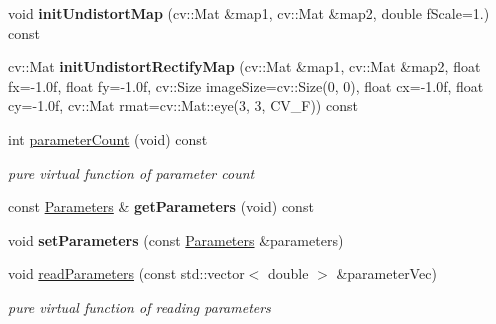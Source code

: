 \begin{DoxyCompactItemize}
\mbox{\label{classcamodocal_1_1PinholeCamera_a8553c07cf81d005a24b335b3da9ceed4}} 
void {\bfseries init\+Undistort\+Map} (cv\+::\+Mat \&map1, cv\+::\+Mat \&map2, double f\+Scale=1.) const
\item 
\mbox{\label{classcamodocal_1_1PinholeCamera_a693831534ad3140dd83f18371e761fbb}} 
cv\+::\+Mat {\bfseries init\+Undistort\+Rectify\+Map} (cv\+::\+Mat \&map1, cv\+::\+Mat \&map2, float fx=-\/1.\+0f, float fy=-\/1.\+0f, cv\+::\+Size image\+Size=cv\+::\+Size(0, 0), float cx=-\/1.\+0f, float cy=-\/1.\+0f, cv\+::\+Mat rmat=cv\+::\+Mat\+::eye(3, 3, C\+V\+\_\+F)) const
\item 
\mbox{\label{classcamodocal_1_1PinholeCamera_af1b4715f8d9a6a7ba3e866d5bf2721d2}} 
int \hyperlink{classcamodocal_1_1PinholeCamera_af1b4715f8d9a6a7ba3e866d5bf2721d2}{parameter\+Count} (void) const
\begin{DoxyCompactList}\small\item\em pure virtual function of parameter count \end{DoxyCompactList}\item 
\mbox{\label{classcamodocal_1_1PinholeCamera_a8aae0528cc081d881b3052fde80b1d24}} 
const \hyperlink{classcamodocal_1_1PinholeCamera_1_1Parameters}{Parameters} \& {\bfseries get\+Parameters} (void) const
\item 
\mbox{\label{classcamodocal_1_1PinholeCamera_ae3b36f6c08d76b4abe2b00c34f3ef58b}} 
void {\bfseries set\+Parameters} (const \hyperlink{classcamodocal_1_1PinholeCamera_1_1Parameters}{Parameters} \&parameters)
\item 
\mbox{\label{classcamodocal_1_1PinholeCamera_a6014010b2fb08fbef76fa5ef2f4b5d80}} 
void \hyperlink{classcamodocal_1_1PinholeCamera_a6014010b2fb08fbef76fa5ef2f4b5d80}{read\+Parameters} (const std\+::vector$<$ double $>$ \&parameter\+Vec)
\begin{DoxyCompactList}\small\item\em pure virtual function of reading parameters \end{DoxyCompactList}\item 
\mbox{\label{classcamodocal_1_1PinholeCamera_a87f00320069f054a1dff89e23d65fa0b}} 

\end{DoxyCompactItemize}

